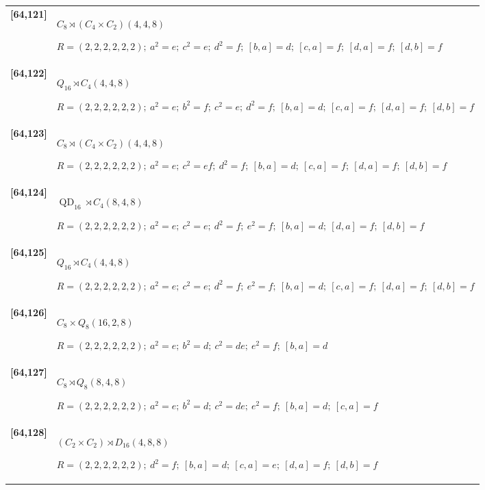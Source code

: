\documentclass[UTF8,fontset=fandol,11pt,a4paper]{ctexart}
\begin{document}
\begin{longtable}{@{}p{17mm}>{\raggedright\arraybackslash}p{141mm}@{}}
\textbf{[64,121]} & $C_{8}\rtimes (C_{4}\times C_{2})$\quad $(4,4,8)$\par\(R=(2,2,2,2,2,2);\allowbreak\ a^{2}=e;\allowbreak\ c^{2}=e;\allowbreak\ d^{2}=f;\allowbreak\ [b,a]=d;\allowbreak\ [c,a]=f;\allowbreak\ [d,a]=f;\allowbreak\ [d,b]=f\)\\[3pt]

\textbf{[64,122]} & $Q_{16}\rtimes C_{4}$\quad $(4,4,8)$\par\(R=(2,2,2,2,2,2);\allowbreak\ a^{2}=e;\allowbreak\ b^{2}=f;\allowbreak\ c^{2}=e;\allowbreak\ d^{2}=f;\allowbreak\ [b,a]=d;\allowbreak\ [c,a]=f;\allowbreak\ [d,a]=f;\allowbreak\ [d,b]=f\)\\[3pt]

\textbf{[64,123]} & $C_{8}\rtimes (C_{4}\times C_{2})$\quad $(4,4,8)$\par\(R=(2,2,2,2,2,2);\allowbreak\ a^{2}=e;\allowbreak\ c^{2}=ef;\allowbreak\ d^{2}=f;\allowbreak\ [b,a]=d;\allowbreak\ [c,a]=f;\allowbreak\ [d,a]=f;\allowbreak\ [d,b]=f\)\\[3pt]

\textbf{[64,124]} & $\operatorname{QD}_{16}\rtimes C_{4}$\quad $(8,4,8)$\par\(R=(2,2,2,2,2,2);\allowbreak\ a^{2}=e;\allowbreak\ c^{2}=e;\allowbreak\ d^{2}=f;\allowbreak\ e^{2}=f;\allowbreak\ [b,a]=d;\allowbreak\ [d,a]=f;\allowbreak\ [d,b]=f\)\\[3pt]

\textbf{[64,125]} & $Q_{16}\rtimes C_{4}$\quad $(4,4,8)$\par\(R=(2,2,2,2,2,2);\allowbreak\ a^{2}=e;\allowbreak\ c^{2}=e;\allowbreak\ d^{2}=f;\allowbreak\ e^{2}=f;\allowbreak\ [b,a]=d;\allowbreak\ [c,a]=f;\allowbreak\ [d,a]=f;\allowbreak\ [d,b]=f\)\\[3pt]

\textbf{[64,126]} & $C_{8}\times Q_{8}$\quad $(16,2,8)$\par\(R=(2,2,2,2,2,2);\allowbreak\ a^{2}=e;\allowbreak\ b^{2}=d;\allowbreak\ c^{2}=de;\allowbreak\ e^{2}=f;\allowbreak\ [b,a]=d\)\\[3pt]

\textbf{[64,127]} & $C_{8}\rtimes Q_{8}$\quad $(8,4,8)$\par\(R=(2,2,2,2,2,2);\allowbreak\ a^{2}=e;\allowbreak\ b^{2}=d;\allowbreak\ c^{2}=de;\allowbreak\ e^{2}=f;\allowbreak\ [b,a]=d;\allowbreak\ [c,a]=f\)\\[3pt]

\textbf{[64,128]} & $(C_{2}\times C_{2})\rtimes D_{16}$\quad $(4,8,8)$\par\(R=(2,2,2,2,2,2);\allowbreak\ d^{2}=f;\allowbreak\ [b,a]=d;\allowbreak\ [c,a]=e;\allowbreak\ [d,a]=f;\allowbreak\ [d,b]=f\)\\[3pt]


\end{longtable}
\end{document}
